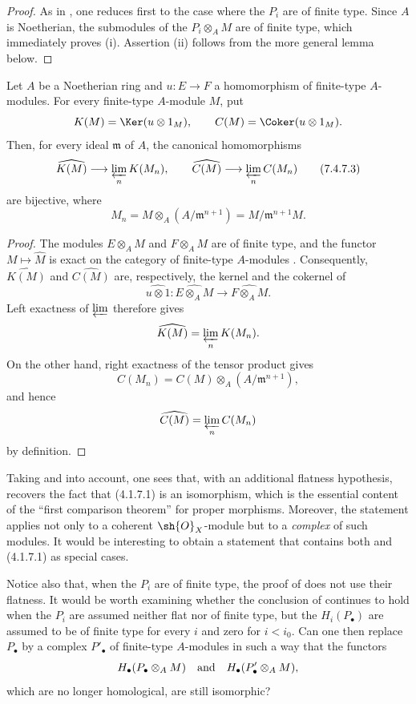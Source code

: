 \begin{proof}
As in , one reduces first to the case where the
$P_i$ are of finite type.  Since $A$ is Noetherian, the
submodules of the $P_i\otimes_A M$ are of finite type, which
immediately proves (i).  Assertion (ii) follows from the more
general lemma below.
\end{proof}

\begin{lemma}[7.4.7.2]
\label{III.7.4.7.2}
Let $A$ be a Noetherian ring and $u:E\to F$ a homomorphism of
finite-type $A$-modules.  For every finite-type $A$-module
$M$, put
\[
  K(M)=\Ker(u\otimes 1_M),
  \qquad
  C(M)=\Coker(u\otimes 1_M).
\]
Then, for every ideal $\mathfrak m$ of $A$, the canonical
homomorphisms
\[
  \widehat{K(M)}
  \longrightarrow
  \varprojlim_n K(M_n),
  \qquad
  \widehat{C(M)}
  \longrightarrow
  \varprojlim_n C(M_n)
  \tag{7.4.7.3}\label{III.7.4.7.3.eq}
\]
are bijective, where
\[
  M_n
  =
  M\otimes_A(A/\mathfrak m^{n+1})
  =
  M/\mathfrak m^{n+1}M.
\]
\end{lemma}

\begin{proof}
The modules $E\otimes_A M$ and $F\otimes_A M$ are of finite
type, and the functor $M\mapsto\widehat{M}$ is exact on the
category of finite-type $A$-modules .
Consequently, $\widehat{K(M)}$ and $\widehat{C(M)}$ are,
respectively, the kernel and the cokernel of
\[
  \widehat{u\otimes 1}:
  \widehat{E\otimes_A M}
  \longrightarrow
  \widehat{F\otimes_A M}.
\]
Left exactness of $\varprojlim$ therefore gives
\[
  \widehat{K(M)}
  =
  \varprojlim_n K(M_n).
\]
On the other hand, right exactness of the tensor product gives
\[
  C(M_n)
  =
  C(M)\otimes_A(A/\mathfrak m^{n+1}),
\]
and hence
\[
  \widehat{C(M)}
  =
  \varprojlim_n C(M_n)
\]
by definition.
\end{proof}

\begin{remark}[7.4.8]
\label{III.7.4.8}
Taking  and  into account,
one sees that, with an additional flatness hypothesis,
 recovers the fact that
(4.1.7.1) is an isomorphism, which is the
essential content of the ``first comparison theorem'' for
proper morphisms.  Moreover, the statement applies not only
to a coherent $\sh{O}_X$-module but to a \emph{complex} of
such modules.  It would be interesting to obtain a statement
that contains both  and
(4.1.7.1) as special cases.

Notice also that, when the $P_i$ are of finite type, the proof
of  does not use their flatness.  It would be
worth examining whether the conclusion of 
continues to hold when the $P_i$ are assumed neither flat nor
of finite type, but the $H_i(P_\bullet)$ are assumed to be of
finite type for every $i$ and zero for $i<i_0$.  Can one then
replace $P_\bullet$ by a complex $P'_\bullet$ of finite-type
$A$-modules in such a way that the functors
\[
  H_\bullet(P_\bullet\otimes_A M)
  \quad\hbox{and}\quad
  H_\bullet(P'_\bullet\otimes_A M),
\]
which are no longer homological, are still isomorphic?
\end{remark}
